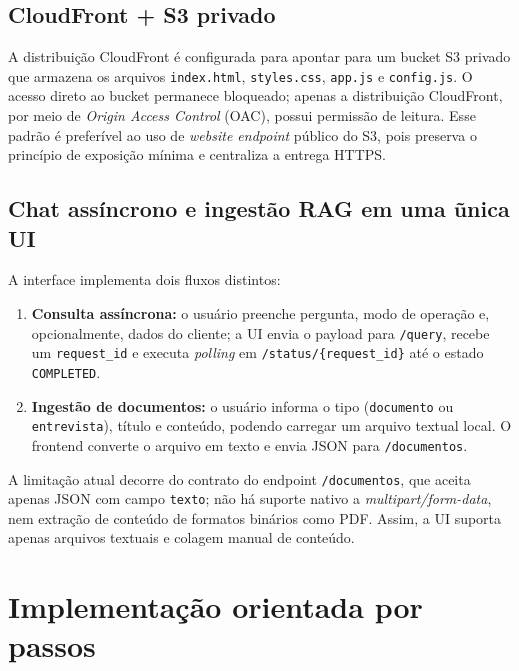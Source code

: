 \subsection{CloudFront + S3 privado}

A distribui\c{c}\~ao CloudFront \'e configurada para apontar para um bucket
S3 privado que armazena os arquivos \texttt{index.html}, \texttt{styles.css},
\texttt{app.js} e \texttt{config.js}. O acesso direto ao bucket permanece
bloqueado; apenas a distribui\c{c}\~ao CloudFront, por meio de
\textit{Origin Access Control} (OAC), possui permiss\~ao de leitura.
Esse padr\~ao \'e prefer\'ivel ao uso de \textit{website endpoint}
p\'ublico do S3, pois preserva o princ\'ipio de exposi\c{c}\~ao m\'inima e
centraliza a entrega HTTPS.

\subsection{Chat ass\'incrono e ingest\~ao RAG em uma \~unica UI}

A interface implementa dois fluxos distintos:

\begin{enumerate}[leftmargin=*]
  \item \textbf{Consulta ass\'incrona:} o usu\'ario preenche pergunta,
        modo de opera\c{c}\~ao e, opcionalmente, dados do cliente; a UI
        envia o payload para \texttt{/query}, recebe um
        \texttt{request\_id} e executa \textit{polling}
        em \texttt{/status/\{request\_id\}} at\'e o estado \texttt{COMPLETED}.
  \item \textbf{Ingest\~ao de documentos:} o usu\'ario informa o tipo
        (\texttt{documento} ou \texttt{entrevista}), t\'itulo e conte\'udo,
        podendo carregar um arquivo textual local. O frontend converte o
        arquivo em texto e envia JSON para \texttt{/documentos}.
\end{enumerate}

A limita\c{c}\~ao atual decorre do contrato do endpoint \texttt{/documentos},
que aceita apenas JSON com campo \texttt{texto}; n\~ao h\'a suporte nativo a
\textit{multipart/form-data}, nem extra\c{c}\~ao de conte\'udo de formatos
bin\'arios como PDF. Assim, a UI suporta apenas arquivos textuais e colagem
manual de conte\'udo.

\section{Implementa\c{c}\~ao orientada por passos}

